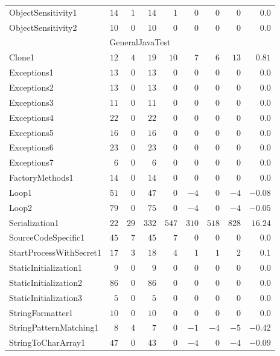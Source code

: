 \documentclass[../draft.tex]{subfiles}
\newcommand{\tsubEight}[1]{\multicolumn{9}{c}{#1}\\\hline}
\begin{document}
\begin{longtable}{l | r | r | r | r | r | r | r | r}
        ObjectSensitivity1 & $14$ & $1$ & $14$ & $1$ & $0$ & $0$ & $0$ & $0.0$\\
        ObjectSensitivity2 & $10$ & $0$ & $10$ & $0$ & $0$ & $0$ & $0$ & $0.0$\\
        \hline
        \tsubEight{GeneralJavaTest}
        Clone1 & $12$ & $4$ & $19$ & $10$ & $7$ & $6$ & $13$ & $0.81$\\
        Exceptions1 & $13$ & $0$ & $13$ & $0$ & $0$ & $0$ & $0$ & $0.0$\\
        Exceptions2 & $13$ & $0$ & $13$ & $0$ & $0$ & $0$ & $0$ & $0.0$\\
        Exceptions3 & $11$ & $0$ & $11$ & $0$ & $0$ & $0$ & $0$ & $0.0$\\
        Exceptions4 & $22$ & $0$ & $22$ & $0$ & $0$ & $0$ & $0$ & $0.0$\\
        Exceptions5 & $16$ & $0$ & $16$ & $0$ & $0$ & $0$ & $0$ & $0.0$\\
        Exceptions6 & $23$ & $0$ & $23$ & $0$ & $0$ & $0$ & $0$ & $0.0$\\
        Exceptions7 & $6$ & $0$ & $6$ & $0$ & $0$ & $0$ & $0$ & $0.0$\\
        FactoryMethods1 & $14$ & $0$ & $14$ & $0$ & $0$ & $0$ & $0$ & $0.0$\\
        Loop1 & $51$ & $0$ & $47$ & $0$ & $-4$ & $0$ & $-4$ & $-0.08$\\
        Loop2 & $79$ & $0$ & $75$ & $0$ & $-4$ & $0$ & $-4$ & $-0.05$\\
        Serialization1 & $22$ & $29$ & $332$ & $547$ & $310$ & $518$ & $828$ & $16.24$\\
        SourceCodeSpecific1 & $45$ & $7$ & $45$ & $7$ & $0$ & $0$ & $0$ & $0.0$\\
        StartProcessWithSecret1 & $17$ & $3$ & $18$ & $4$ & $1$ & $1$ & $2$ & $0.1$\\
        StaticInitialization1 & $9$ & $0$ & $9$ & $0$ & $0$ & $0$ & $0$ & $0.0$\\
        StaticInitialization2 & $86$ & $0$ & $86$ & $0$ & $0$ & $0$ & $0$ & $0.0$\\
        StaticInitialization3 & $5$ & $0$ & $5$ & $0$ & $0$ & $0$ & $0$ & $0.0$\\
        StringFormatter1 & $10$ & $0$ & $10$ & $0$ & $0$ & $0$ & $0$ & $0.0$\\
        StringPatternMatching1 & $8$ & $4$ & $7$ & $0$ & $-1$ & $-4$ & $-5$ & $-0.42$\\
        StringToCharArray1 & $47$ & $0$ & $43$ & $0$ & $-4$ & $0$ & $-4$ & $-0.09$\\

\end{longtable}
\end{document}
